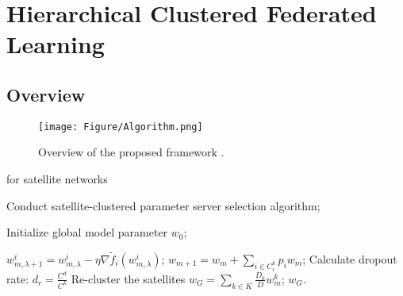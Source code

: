 \section{Hierarchical Clustered 
Federated Learning } \label{sec:algorithm} 

\subsection{Overview}

\begin{figure}[tb!]
\centerline{\texttt{[image: Figure/Algorithm.png]}}
\caption{Overview of the proposed framework \algname.}
\label{fig:overview}
\end{figure}

\begin{algorithm}
\begin{algorithmic}[1]
\caption{\algname for satellite networks}\label{alg:decentralized_FL}

\STATE Conduct satellite-clustered parameter server selection algorithm;  \label{line:1}

\STATE {}  \label{line:2}
     \STATE Initialize global model parameter $w_0$;
\ENDFOR  \label{line:5}


  \label{line:6}
    \STATE {}
        \STATE $w_{m,\lambda+1}^{i} = w_{m,\lambda}^{i} - \eta \nabla \tilde{f}_i(w_{m,\lambda}^{i})$;
    \ENDFOR \label{line:9}
    \STATE {}
      \label{line:12}
        \STATE $w_{m+1} = w_m + \sum_{i \in C^k_i} p_i w_m$;   \label{line:13}
    \STATE {}  \label{line:14}
        \STATE Calculate dropout rate: $d_r = \frac{C^d}{C^k}$
            \STATE Re-cluster the satellites
        \ENDIF  \label{line:18}
    \ENDFOR
\ENDFOR  
\STATE {}  \label{line:21}
    \STATE $w_{G} =  \sum_{k \in {K}} \frac{D_k}{D} w_m^k$;  
\ENDFOR  \label{line:23}
\RETURN $w_{G}$.
\end{algorithmic}
\end{algorithm}

